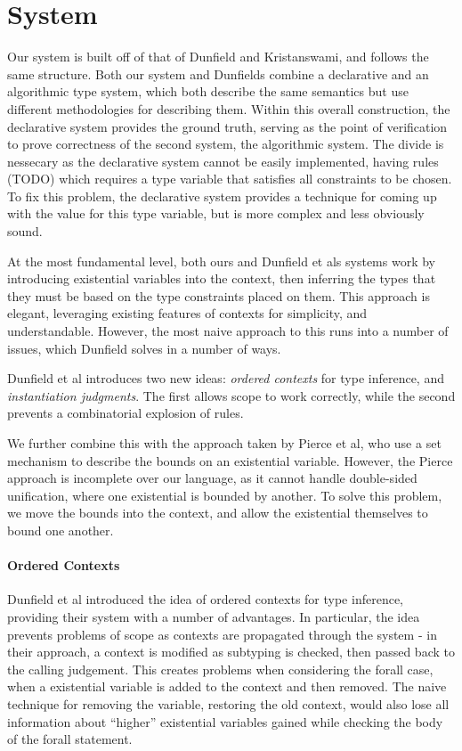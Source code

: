 \documentclass{llncs}
\begin{document}
\section{System}
Our system is built off of that of Dunfield and Kristanswami, and follows the same structure. Both our system and Dunfields combine a declarative and an algorithmic type system, which both describe the same semantics but use different methodologies for describing them. Within this overall construction, the declarative system provides the ground truth, serving as the point of verification to prove correctness of the second system, the algorithmic system. The divide is nessecary as the declarative system cannot be easily implemented, having rules (TODO) which requires a type variable that satisfies all constraints to be chosen. To fix this problem, the declarative system provides a technique for coming up with the value for this type variable, but is more complex and less obviously sound.

At the most fundamental level, both ours and Dunfield et als systems work by introducing existential variables into the context, then inferring the types that they must be based on the type constraints placed on them. This approach is elegant, leveraging existing features of contexts for simplicity, and understandable. However, the most naive approach to this runs into a number of issues, which Dunfield solves in a number of ways.

Dunfield et al introduces two new ideas: \emph{ordered contexts} for type inference, and \emph{instantiation judgments}. The first allows scope to work correctly, while the second prevents a combinatorial explosion of rules. 

We further combine this with the approach taken by Pierce et al, who use a set mechanism to describe the bounds on an existential variable. However, the Pierce approach is incomplete over our language, as it cannot handle double-sided unification, where one existential is bounded by another. To solve this problem, we move the bounds into the context, and allow the existential themselves to bound one another.

\paragraph{Ordered Contexts}
Dunfield et al introduced the idea of ordered contexts for type inference, providing their system with a number of advantages. In particular, the idea prevents problems of scope as contexts are propagated through the system - in their approach, a context is modified as subtyping is checked, then passed back to the calling judgement. This creates problems when considering the forall case, when a existential variable is added to the context and then removed. The naive technique for removing the variable, restoring the old context, would also lose all information about ``higher'' existential variables gained while checking the body of the forall statement.
\end{document}
